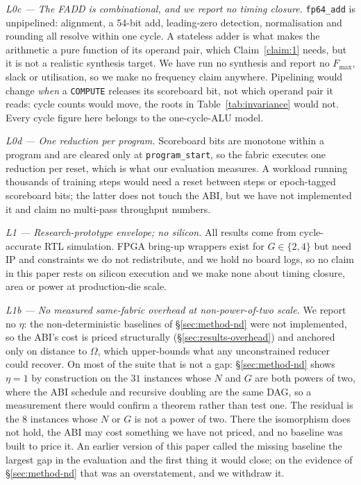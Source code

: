 \documentclass[journal,10pt]{IEEEtran}
\theoremstyle{plain}
\theoremstyle{definition}
\theoremstyle{remark}
\newcommand{\sv}[1]{\texttt{#1}}
\begin{document}
\emph{L0c --- The FADD is combinational, and we report no timing closure.}
\sv{fp64\_add} is unpipelined: alignment, a 54-bit add, leading-zero
detection, normalisation and rounding all resolve within one cycle. A
stateless adder is what makes the arithmetic a pure function of its operand
pair, which Claim~\ref{claim:1} needs, but it is not a realistic synthesis
target. We have run no synthesis and report no $F_{\max}$, slack or
utilisation, so we make no frequency claim anywhere. Pipelining would change
\emph{when} a \texttt{COMPUTE} releases its scoreboard bit, not which operand
pair it reads: cycle counts would move, the roots in
Table~\ref{tab:invariance} would not. Every cycle figure here belongs to the
one-cycle-ALU model.

\emph{L0d --- One reduction per program.} Scoreboard bits are monotone within
a program and are cleared only at \sv{program\_start}, so the fabric executes
one reduction per reset, which is what our evaluation measures. A workload
running thousands of training steps would need a reset between steps or
epoch-tagged scoreboard bits; the latter does not touch the ABI, but we have
not implemented it and claim no multi-pass throughput numbers.

\emph{L1 --- Research-prototype envelope; no silicon.} All results come from
cycle-accurate RTL simulation. FPGA bring-up wrappers exist for
$G \in \{2,4\}$ but need IP and constraints we do not redistribute, and we
hold no board logs, so no claim in this paper rests on silicon execution and
we make none about timing closure, area or power at production-die scale.

\emph{L1b --- No measured same-fabric overhead at non-power-of-two scale.} We
report no $\eta$: the non-deterministic baselines of \S\ref{sec:method-nd}
were not implemented, so the ABI's cost is priced structurally
(\S\ref{sec:results-overhead}) and anchored only on distance to $\Omega$,
which upper-bounds what any unconstrained reducer could recover. On most of
the suite that is not a gap: \S\ref{sec:method-nd} shows $\eta = 1$ by
construction on the $31$ instances whose $N$ and $G$ are both powers of two,
where the ABI schedule and recursive doubling are the same DAG, so a
measurement there would confirm a theorem rather than test one. The residual
is the $8$ instances whose $N$ or $G$ is not a power of two. There the
isomorphism does not hold, the ABI may cost something we have not priced, and
no baseline was built to price it. An earlier version of this paper called the
missing baseline the largest gap in the evaluation and the first thing it
would close; on the evidence of \S\ref{sec:method-nd} that was an
overstatement, and we withdraw it.
\end{document}
